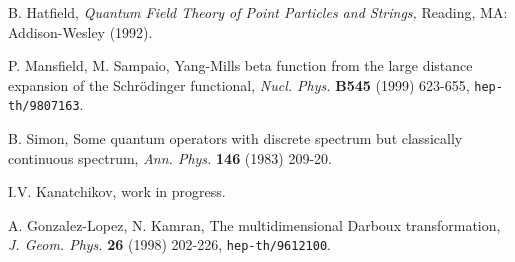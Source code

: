 \documentclass[12pt]{article}
\begin{document}
\begin{thebibliography}{99}
B. Hatfield,  
{\sl Quantum Field Theory of Point 
Particles and Strings, }  
Reading, MA: Addison-Wesley (1992).  

 P. Mansfield, M. Sampaio, 
{Yang-Mills beta function from the large distance 
expansion of the Schr\"odinger functional, } 
{\em Nucl. Phys. } {\bf B545} (1999) 623-655, 
{\tt hep-th/9807163}. 

 B. Simon, 
Some quantum operators with discrete spectrum but 
classically continuous spectrum, 
{\em Ann. Phys.} {\bf 146} (1983) 209-20. 
 
 I.V. Kanatchikov, work in progress.  

 A. Gonzalez-Lopez, N. Kamran, 
The multidimensional Darboux transformation, 
{\em J. Geom. Phys.} {\bf 26} (1998) 202-226, 
{\tt hep-th/9612100}. 

\end{thebibliography}
\end{document}
